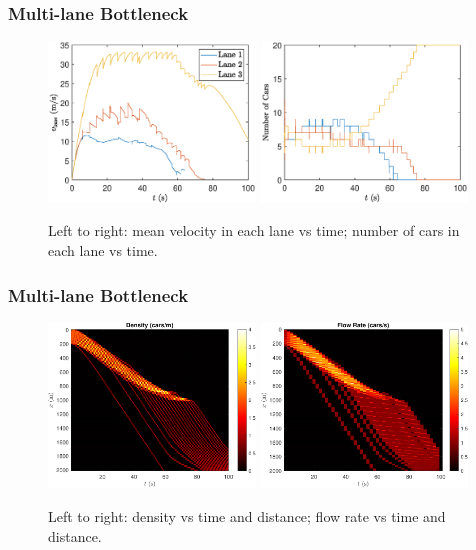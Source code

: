 \documentclass{beamer}
\begin{document}
\begin{frame}
  \frametitle{Multi-lane Bottleneck}
  \begin{figure}[H]
    \includegraphics[width=5.5cm]{mlbn_laneSpeed.eps}
    \includegraphics[width=5.5cm]{mlbn_lanecars.eps}
    \caption{Left to right: mean velocity in each lane vs time; number of cars in each lane vs time.}
\end{figure}
\end{frame}

\begin{frame}
  \frametitle{Multi-lane Bottleneck}
  \begin{figure}[H]
    \includegraphics[width=5.5cm]{mlbn_density.pdf}
    \includegraphics[width=5.5cm]{mlbn_flow.pdf}
    \caption{Left to right: density vs time and distance; flow rate vs time and distance.}
\end{figure}
\end{frame}
\end{document}
